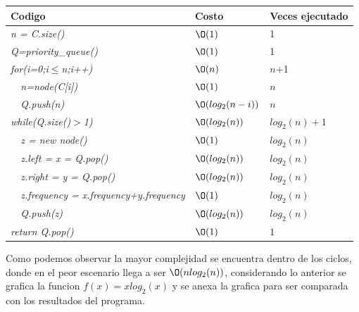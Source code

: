 \documentclass[spanish]{article}
\begin{document}
	\begin{center}
		\begin{table}[H]
			\begin{tabular}{|l|l|l|}
				\hline
				\rowcolor[HTML]{FFCC67} 
				Codigo                           & Costo & Veces ejecutado \\ \hline
				\textit{n = C.size()}                    & $\O(1)$    & 1               \\ \hline
				\textit{Q=priority\_queue()}                    & $\O(1)$    & 1               \\ \hline
				\textit{for(i=0;i$\leq$n;i++)} & $\O(n)$    & $n$+1             \\ \hline
				\textit{\  \  n=node(C[i])}                 & $\O(1)$    & $n$               \\ \hline
				\textit{\  \  Q.push(n)}                     & $\O(log_2(n-i))$    & $n$              \\ \hline
				\textit{while(Q.size()$>$1)} & $\O(log_2(n))$    & $log_2(n)+1$             \\ \hline
				\textit{\  \  z = new node()}                     & $\O(1)$    & $log_2(n)$               \\ \hline
				\textit{\  \  z.left = x = Q.pop()}                     & $\O(log_2(n))$    & $log_2(n)$               \\ \hline
				\textit{\  \  z.right = y = Q.pop()}                     & $\O(log_2(n))$    & $log_2(n)$               \\ \hline
				\textit{\  \  z.frequency = x.frequency+y.frequency}                     & $\O(1)$    & $log_2(n)$               \\ \hline
				\textit{\  \  Q.push(z)}                     & $\O(log_2(n))$    & $log_2(n)$               \\ \hline
				\textit{return Q.pop()}                     & $\O(1)$    & $1$               \\ \hline
			\end{tabular}
		\end{table}										
	\end{center}	
	Como podemos observar la mayor complejidad se encuentra dentro de los ciclos, donde en el peor escenario llega a ser $\O(nlog_2(n))$, considerando lo anterior se grafica la funcion $f(x) = xlog_2(x)$ y se anexa la grafica para ser comparada con los resultados del programa.
\end{document}
